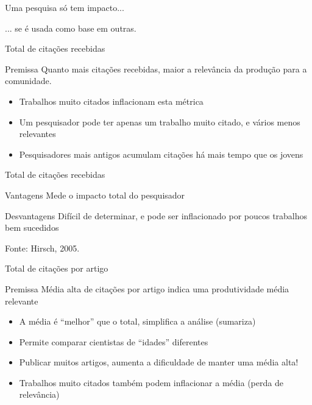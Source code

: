 \documentclass{beamer}
\begin{document}
\begin{frame}
  \begin{center}
    Uma pesquisa só tem impacto...

  \bigskip
    ... se é usada como base em outras.
  \end{center}
\end{frame}

\begin{frame}{Total de citações recebidas}
  \begin{block}{Premissa}
    Quanto mais citações recebidas, maior a relevância da produção para a comunidade.
  \end{block}
  \bigskip
  \bigskip
  \begin{itemize}
    \footnotesize
  \item Trabalhos muito citados inflacionam esta métrica
  \item Um pesquisador pode ter apenas um trabalho muito citado, e vários menos relevantes
  \item Pesquisadores mais antigos acumulam citações há mais tempo que os jovens
  \end{itemize}
\end{frame}

\begin{frame}{Total de citações recebidas}
  \begin{block}{Vantagens}
    Mede o impacto total do pesquisador
  \end{block}
  \bigskip
  \begin{block}{Desvantagens}
    Difícil de determinar, e pode ser inflacionado por poucos trabalhos bem sucedidos
  \end{block}

  \vfill
  \footnotesize
  \hfill Fonte: Hirsch, 2005.
\end{frame}

\begin{frame}{Total de citações por artigo}
  \begin{block}{Premissa}
    Média alta de citações por artigo indica uma produtividade média relevante
  \end{block}
  \bigskip
  \bigskip
  \begin{itemize}
    \footnotesize
  \item A média é ``melhor'' que o total, simplifica a análise (sumariza)
  \item Permite comparar cientistas de ``idades'' diferentes
  \item Publicar muitos artigos, aumenta a dificuldade de manter uma média alta!
  \item Trabalhos muito citados também podem inflacionar a média (perda de relevância)
  \end{itemize}
\end{frame}
\end{document}
